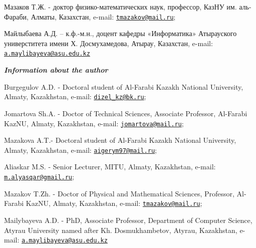 Мазаков Т.Ж. - доктор физико-математических наук, профессор, КазНУ им.
аль-Фараби, Алматы, Казахстан, e-mail:
\href{mailto:tmazakov@mail.ru}{\nolinkurl{tmazakov@mail.ru}};

Майлыбаева А.Д. -- к.ф.-м.н., доцент кафедры «Информатика» Атырауского
универститета имени Х. Досмухамедова, Атырау, Казахстан, e-mail:
\href{mailto:a.maylibayeva@asu.edu.kz}{\nolinkurl{a.maylibayeva@asu.edu.kz}}

\emph{{\bfseries Information about the author}}

Burgegulov A.D. - Doctoral student of Al-Farabi Kazakh National
University, Almaty, Kazakhstan, e-mail:
\href{mailto:dizel_kz@bk.ru}{\nolinkurl{dizel\_kz@bk.ru}};

Jomartova Sh.A. - Doctor of Technical Sciences, Associate Professor,
Al-Farabi KazNU, Almaty, Kazakhstan, e-mail:
\href{mailto:jomartova@mail.ru}{\nolinkurl{jomartova@mail.ru}};

Mazakova A.T.- Doctoral student of Al-Farabi Kazakh National University,
Almaty, Kazakhstan, e-mail:
\href{mailto:aigerym97@mail.ru}{\nolinkurl{aigerym97@mail.ru}};

Aliaskar M.S. - Senior Lecturer, MITU, Almaty, Kazakhstan, e-mail:
\href{mailto:m.alyasqar@gmail.ru}{\nolinkurl{m.alyasqar@gmail.ru}};

Mazakov T.Zh. - Doctor of Physical and Mathematical Sciences, Professor,
Al-Farabi KazNU, Almaty, Kazakhstan, e-mail:
\href{mailto:tmazakov@mail.ru}{\nolinkurl{tmazakov@mail.ru}};

Mailybayeva A.D. - PhD, Associate Professor, Department of Computer
Science, Atyrau University named after Kh. Dosmukhambetov, Atyrau,
Kazakhstan, e-mail:
\href{mailto:a.maylibayeva@asu.edu.kz}{\nolinkurl{a.maylibayeva@asu.edu.kz}}